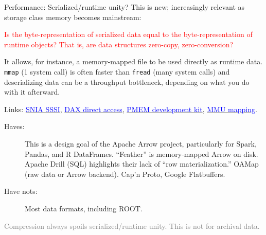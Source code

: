 \documentclass[aspectratio=169]{beamer}
\begin{document}
\begin{frame}{Performance: Serialized/runtime unity?}
\vspace{0.5 cm}
This is new; increasingly relevant as storage class memory becomes mainstream:

\begin{center}
\begin{minipage}{0.9\linewidth}
\textcolor{red}{Is the byte-representation of serialized data equal to the byte-representation of runtime objects? That is, are data structures zero-copy, zero-conversion?}
\end{minipage}
\end{center}

It allows, for instance, a memory-mapped file to be used directly as runtime data. {\tt\small mmap} (1 system call) is often faster than {\tt\small fread} (many system calls) and deserializing data can be a throughput bottleneck, depending on what you do with it afterward.

\vspace{0.25 cm}

Links: \href{https://www.snia.org/forums/sssi}{\textcolor{blue}{SNIA SSSI}}, \href{https://lwn.net/Articles/717953/}{\textcolor{blue}{DAX direct access}}, \href{https://pmem.io/}{\textcolor{blue}{PMEM development kit}}, \href{http://scitechconnect.elsevier.com/memory-management-unit/}{\textcolor{blue}{MMU mapping}}.

\vspace{0.15 cm}

\begin{description}
\item[Haves:] This is a design goal of the Apache Arrow project, particularly for Spark, Pandas, and R DataFrames. ``Feather'' is memory-mapped Arrow on disk. Apache Drill (SQL) highlights their lack of ``row materialization.'' OAMap (raw data or Arrow backend). Cap'n Proto, Google Flatbuffers.

\item[Have nots:] Most data formats, including ROOT.
\end{description}

\vspace{0.1 cm}
\textcolor{gray}{Compression always spoils serialized/runtime unity. This is not for archival data.}
\end{frame}
\end{document}
